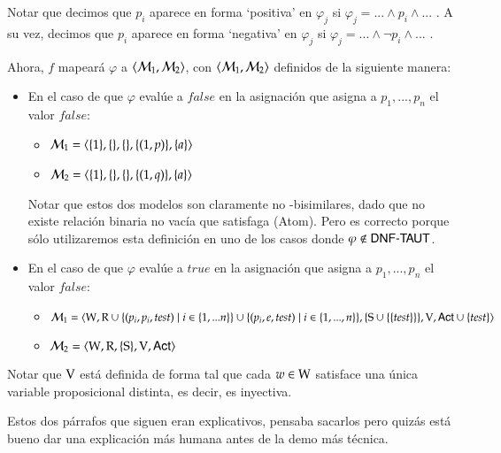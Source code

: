 \begin{demostracion}
    Notar que decimos que $p_i$ aparece en forma `positiva' en $\varphi_j$ si $\varphi_j = ... \wedge p_i \wedge...$ . 
    A su vez, decimos que $p_i$ aparece en forma `negativa' en $\varphi_j$ si $\varphi_j = ...\wedge \neg p_i \wedge...$ .

    Ahora, $f$ mapeará $\varphi$ a $\langle \mathcal{M}_1,\mathcal{M}_2 \rangle$, con $\langle \mathcal{M}_1,\mathcal{M}_2 \rangle$ definidos de la siguiente manera:

    \begin{itemize}
        \item En el caso de que $\varphi$ evalúe a $false$ en la asignación que asigna a $p_1,...,p_n$ el valor $false$:

        \begin{itemize}
            \item $\mathcal{M}_1=\langle \{1\},\{\},\{\},\{(1,p)\},\{a\} \rangle$
            \item $\mathcal{M}_2=\langle \{1\},\{\},\{\},\{(1,q)\},\{a\} \rangle$
        \end{itemize}

        Notar que estos dos modelos son claramente no \KHilogic-bisimilares, dado que no existe relación binaria no vacía 
        que satisfaga (Atom). Pero es correcto porque sólo utilizaremos esta definición en uno de los casos donde 
        $\varphi \not \in \rm\textsf{DNF-TAUT}$. 
        
        \item En el caso de que $\varphi$ evalúe a $true$ en la asignación que asigna a $p_1,...,p_n$ el valor $false$:
        
        \begin{itemize}
            \item $\mathcal{M}_1=\langle \mathrm{W},\mathrm{R} \cup \{(p_i,p_i,test) \mid i \in \{1,...n\}\} \cup 
                            \{(p_i,e,test)\mid i \in \{1,...,n\}\},\{\mathrm{S} \cup \{\{test\}\} \},\mathrm{V},{\rm \sf Act} \cup \{test\} \rangle$
            \item $\mathcal{M}_2=\langle \mathrm{W},\mathrm{R},\{ \mathrm{S} \},\mathrm{V},{\rm \sf Act} \rangle$
        \end{itemize}
    \end{itemize}

    
    Notar que $\mathrm{V}$ está definida de forma tal que cada $w\in\mathrm{W}$ satisface una única variable proposicional distinta, es decir, 
    es inyectiva.


\medskip\medskip
    Estos dos párrafos que siguen eran explicativos, pensaba sacarlos pero quizás está bueno dar una explicación más humana 
    antes de la demo más técnica.


\end{demostracion}
